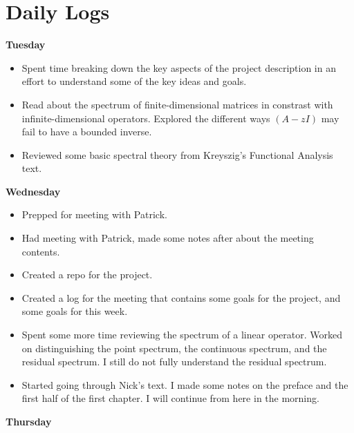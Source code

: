 \documentclass[12pt,a4paper]{article}
\begin{document}
\section{Daily Logs}

\textbf{Tuesday}

    
    \begin{itemize} 
        \item Spent time breaking down the key aspects of the project description in an effort to understand some of the key ideas and goals.
        \item Read about the spectrum of finite-dimensional matrices in constrast with infinite-dimensional operators. Explored the different ways $(A-zI)$ may fail to have a bounded inverse. 
        \item Reviewed some basic spectral theory from Kreyszig's Functional Analysis text. 
    \end{itemize}
    
\textbf{Wednesday}
    
    \begin{itemize}
        \item Prepped for meeting with Patrick.
        \item Had meeting with Patrick, made some notes after about the meeting contents.
        \item Created a repo for the project. 
        \item Created a log for the meeting that contains some goals for the project, and some goals for this week.
        \item Spent some more time reviewing the spectrum of a linear operator. Worked on distinguishing the point spectrum, the continuous spectrum, and the residual spectrum. I still do not fully understand the residual spectrum.
        \item Started going through Nick's text. I made some notes on the preface and the first half of the first chapter. I will continue from here in the morning. 
    \end{itemize}

\textbf{Thursday}
    
\end{document}
